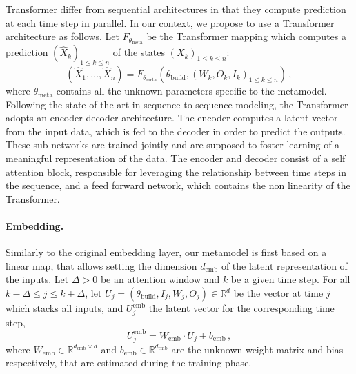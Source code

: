 \documentclass[12pt]{article}
\newcommand{\eqsp}{\,}
\begin{document}
Transformer differ from sequential architectures in that they compute prediction at each time step in parallel. In our context, we propose to use a Transformer architecture as follows. Let $F_{\theta_{\mathrm{meta}}}$ be the Transformer mapping which computes a prediction  $(\widehat X_{k})_{1\leqslant k\leqslant n}$ of the states $(X_{k})_{1\leqslant k\leqslant n}$:
$$
    (\widehat X_1,\ldots,\widehat X_n) = F_{\theta_{\mathrm{meta}}}(\theta_{\mathrm{build}}, (W_k,O_k,I_k)_{1\leqslant k\leqslant n})\,,
$$
where $\theta_{\mathrm{meta}}$ contains all the unknown parameters specific to the metamodel.
Following the state of the art in sequence to sequence modeling, the Transformer  adopts an encoder-decoder architecture. The encoder computes a latent vector from the input data, which is fed to the decoder in order to predict the outputs. These sub-networks are trained jointly and are supposed to foster learning of a meaningful representation of the data. The encoder and decoder consist of a self attention block, responsible for leveraging the relationship between time steps in the sequence, and a feed forward network, which contains the non linearity of the Transformer.

\paragraph{Embedding.}
Similarly to the original embedding layer,  our metamodel is first based on a linear map, that allows setting the dimension $d_{\mathrm{emb}}$ of the latent representation of the inputs.
Let $\Delta >0$ be an  attention window and $k$ be a given time step. For all $k-\Delta \leqslant j\leqslant k+\Delta$, let $U_j = (\theta_{\mathrm{build}}, I_j, W_j, O_j)\in\mathbb{R}^d$ be the vector at time $j$ which stacks all inputs, and $U^{\mathrm{emb}}_j$ the latent vector for the corresponding time step,
$$
    U^{\mathrm{emb}}_j = W_{\mathrm{emb}} \cdot U_j + b_{\mathrm{emb}}\eqsp,
$$
where $W_{\mathrm{emb}}\in\mathbb{R}^{d_{\mathrm{emb}}\times d}$ and $b_{\mathrm{emb}}\in\mathbb{R}^{d_{\mathrm{emb}}}$ are the unknown weight matrix and bias respectively, that are estimated during the training phase.
\end{document}
